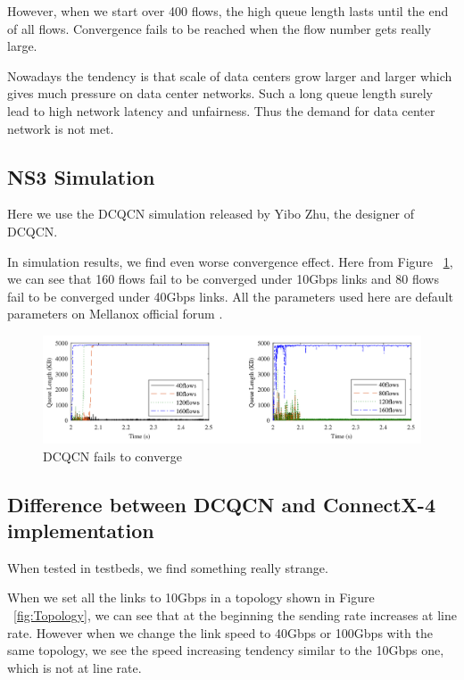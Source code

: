 \documentclass[12pt,a4paper]{article}
\begin{document}
However, when we start over 400 flows, the high queue length lasts until the end of all flows.
Convergence fails to be reached when the flow number gets really large.

Nowadays the tendency is that scale of data centers grow larger and larger which gives much pressure on data center networks.
Such a long queue length surely lead to high network latency and unfairness.
Thus the demand for data center network is not met.

\subsection{NS3 Simulation}

Here we use the DCQCN simulation \cite{DCQCNsim} released by Yibo Zhu, the designer of DCQCN.

In simulation results, we find even worse convergence effect.
Here from Figure ~\ref{fig:DCQCNfail}, we can see that 160 flows fail to be converged under 10Gbps links and 80 flows fail to 
be converged under 40Gbps links.
All the parameters used here are default parameters on Mellanox official forum \cite{MellanoxOfficial}.

\begin{figure}[ht]
	\begin{center}
		\includegraphics[width=6in]{DCQCNfail}
		\caption{DCQCN fails to converge}
		\label{fig:DCQCNfail}
	\end{center}
\end{figure}

\subsection{Difference between DCQCN and ConnectX-4 implementation}

When tested in testbeds, we find something really strange.

When we set all the links to 10Gbps in a topology shown in Figure ~\ref{fig:Topology},
we can see that at the beginning the sending rate increases at line rate.
However when we change the link speed to 40Gbps or 100Gbps with the same topology,
we see the speed increasing tendency similar to the 10Gbps one, which is not at line rate.
\end{document}
